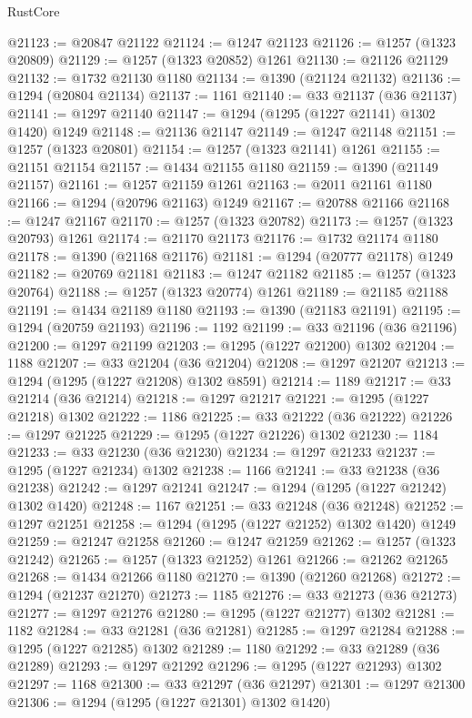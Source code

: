\begin{lexlean}{RustCore}
\begin{coremodule}
@21123 := @20847 @21122
@21124 := @1247 @21123
@21126 := @1257 (@1323 @20809)
@21129 := @1257 (@1323 @20852) @1261
@21130 := @21126 @21129
@21132 := @1732 @21130 @1180
@21134 := @1390 (@21124 @21132)
@21136 := @1294 (@20804 @21134)
@21137 := 1161
@21140 := @33 @21137 (@36 @21137)
@21141 := @1297 @21140
@21147 := @1294 (@1295 (@1227 @21141) @1302 @1420) @1249
@21148 := @21136 @21147
@21149 := @1247 @21148
@21151 := @1257 (@1323 @20801)
@21154 := @1257 (@1323 @21141) @1261
@21155 := @21151 @21154
@21157 := @1434 @21155 @1180
@21159 := @1390 (@21149 @21157)
@21161 := @1257 @21159 @1261
@21163 := @2011 @21161 @1180
@21166 := @1294 (@20796 @21163) @1249
@21167 := @20788 @21166
@21168 := @1247 @21167
@21170 := @1257 (@1323 @20782)
@21173 := @1257 (@1323 @20793) @1261
@21174 := @21170 @21173
@21176 := @1732 @21174 @1180
@21178 := @1390 (@21168 @21176)
@21181 := @1294 (@20777 @21178) @1249
@21182 := @20769 @21181
@21183 := @1247 @21182
@21185 := @1257 (@1323 @20764)
@21188 := @1257 (@1323 @20774) @1261
@21189 := @21185 @21188
@21191 := @1434 @21189 @1180
@21193 := @1390 (@21183 @21191)
@21195 := @1294 (@20759 @21193)
@21196 := 1192
@21199 := @33 @21196 (@36 @21196)
@21200 := @1297 @21199
@21203 := @1295 (@1227 @21200) @1302
@21204 := 1188
@21207 := @33 @21204 (@36 @21204)
@21208 := @1297 @21207
@21213 := @1294 (@1295 (@1227 @21208) @1302 @8591)
@21214 := 1189
@21217 := @33 @21214 (@36 @21214)
@21218 := @1297 @21217
@21221 := @1295 (@1227 @21218) @1302
@21222 := 1186
@21225 := @33 @21222 (@36 @21222)
@21226 := @1297 @21225
@21229 := @1295 (@1227 @21226) @1302
@21230 := 1184
@21233 := @33 @21230 (@36 @21230)
@21234 := @1297 @21233
@21237 := @1295 (@1227 @21234) @1302
@21238 := 1166
@21241 := @33 @21238 (@36 @21238)
@21242 := @1297 @21241
@21247 := @1294 (@1295 (@1227 @21242) @1302 @1420)
@21248 := 1167
@21251 := @33 @21248 (@36 @21248)
@21252 := @1297 @21251
@21258 := @1294 (@1295 (@1227 @21252) @1302 @1420) @1249
@21259 := @21247 @21258
@21260 := @1247 @21259
@21262 := @1257 (@1323 @21242)
@21265 := @1257 (@1323 @21252) @1261
@21266 := @21262 @21265
@21268 := @1434 @21266 @1180
@21270 := @1390 (@21260 @21268)
@21272 := @1294 (@21237 @21270)
@21273 := 1185
@21276 := @33 @21273 (@36 @21273)
@21277 := @1297 @21276
@21280 := @1295 (@1227 @21277) @1302
@21281 := 1182
@21284 := @33 @21281 (@36 @21281)
@21285 := @1297 @21284
@21288 := @1295 (@1227 @21285) @1302
@21289 := 1180
@21292 := @33 @21289 (@36 @21289)
@21293 := @1297 @21292
@21296 := @1295 (@1227 @21293) @1302
@21297 := 1168
@21300 := @33 @21297 (@36 @21297)
@21301 := @1297 @21300
@21306 := @1294 (@1295 (@1227 @21301) @1302 @1420)

\end{coremodule}
\end{lexlean}
